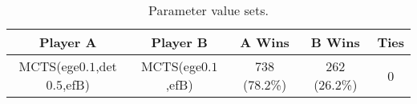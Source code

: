 \documentclass{article}
\begin{document}
\begin{table}[h!]
\begin{center}
\begin{tabular}{|c|c|ccc|}
\hline
Player A & Player B                              & A Wins       & B Wins       & Ties \\ 
\hline
MCTS(ege$0.1$,det$0.5$,efB) & MCTS(ege$0.1$,efB) & 738 (78.2\%) & 262 (26.2\%) & 0    \\ 
\hline
\end{tabular}
\end{center}
\caption{Parameter value sets.}
\label{tbl:parmsets}
\end{table}






%
\end{document}
